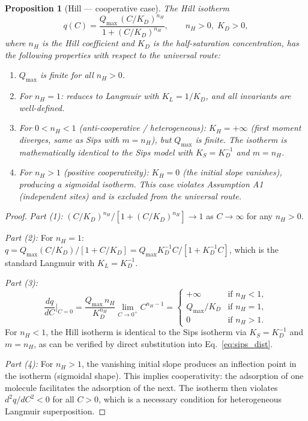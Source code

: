 \documentclass[12pt]{article}
\newtheorem{proposition}{Proposition}
\begin{document}
\begin{proposition}[Hill --- cooperative case]
\label{prop:hill}
The Hill isotherm
\begin{equation}
  q(C) = \frac{Q_{\max}\,(C/K_D)^{n_H}}{1 + (C/K_D)^{n_H}},
  \qquad n_H > 0,\; K_D > 0,
  \label{eq:hill}
\end{equation}
where $n_H$ is the Hill coefficient and $K_D$ is the half-saturation
concentration, has the following properties with respect to the
universal route:
\begin{enumerate}[nosep]
  \item $Q_{\max}$ is finite for all $n_H > 0$.
  \item For $n_H = 1$: reduces to Langmuir with $K_L = 1/K_D$,
        and all invariants are well-defined.
  \item For $0 < n_H < 1$ (anti-cooperative / heterogeneous):
        $K_H = +\infty$ (first moment diverges, same as Sips with
        $m = n_H$), but $Q_{\max}$ is finite.
        The isotherm is mathematically identical to the Sips model
        with $K_S = K_D^{-1}$ and $m = n_H$.
  \item For $n_H > 1$ (positive cooperativity):
        $K_H = 0$ (the initial slope vanishes), producing a sigmoidal
        isotherm.  This case violates Assumption A1 (independent sites)
        and is excluded from the universal route.
\end{enumerate}
\end{proposition}

\begin{proof}
\textit{Part (1):}
$(C/K_D)^{n_H}/[1+(C/K_D)^{n_H}] \to 1$ as $C\to\infty$ for any
$n_H > 0$.

\textit{Part (2):}
For $n_H = 1$: $q = Q_{\max}(C/K_D)/[1+C/K_D]
= Q_{\max}K_D^{-1}C/[1+K_D^{-1}C]$, which is the standard Langmuir
with $K_L = K_D^{-1}$.

\textit{Part (3):}
\[
  \frac{dq}{dC}\bigg|_{C=0}
  = \frac{Q_{\max}\,n_H}{K_D^{n_H}}\lim_{C\to 0^+} C^{n_H-1}
  = \begin{cases}
      +\infty & \text{if } n_H < 1, \\
      Q_{\max}/K_D & \text{if } n_H = 1, \\
      0 & \text{if } n_H > 1.
    \end{cases}
\]
For $n_H < 1$, the Hill isotherm is identical to the Sips isotherm
via $K_S = K_D^{-1}$ and $m = n_H$, as can be verified by direct
substitution into Eq.~\eqref{eq:sips_dist}.

\textit{Part (4):}
For $n_H > 1$, the vanishing initial slope produces an inflection
point in the isotherm (sigmoidal shape).  This implies cooperativity:
the adsorption of one molecule facilitates the adsorption of the next.
The isotherm then violates $d^2q/dC^2 < 0$ for all $C > 0$, which
is a necessary condition for heterogeneous Langmuir superposition.
\end{proof}
\end{document}
